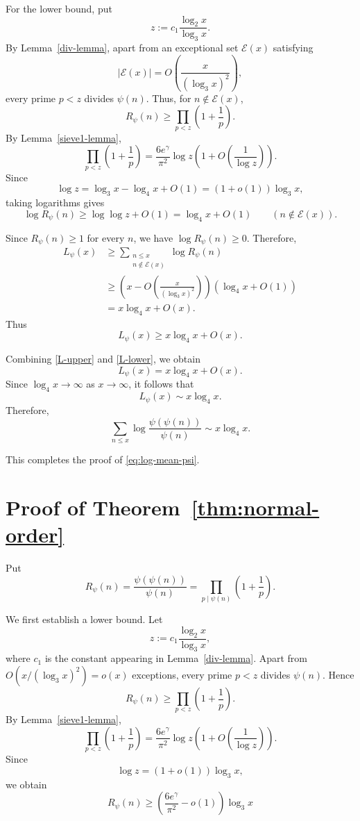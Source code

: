 \documentclass{article}
\theoremstyle{remark}
\begin{document}
For the lower bound, put
\[
z:=c_1\frac{\log_2x}{\log_3x}.
\]
By Lemma~\ref{div-lemma}, apart from an exceptional set
\(\mathcal E(x)\) satisfying
\[
|\mathcal E(x)|
=
O\left(\frac{x}{(\log_3x)^2}\right),
\]
every prime \(p<z\) divides \(\psi(n)\). Thus, for
\(n\notin\mathcal E(x)\),
\[
R_\psi(n)
\ge
\prod_{p<z}\left(1+\frac1p\right).
\]
By Lemma~\ref{sieve1-lemma},
\[
\prod_{p<z}\left(1+\frac1p\right)
=
\frac{6e^\gamma}{\pi^2}\log z
\left(1+O\left(\frac1{\log z}\right)\right).
\]
Since
\[
\log z
=
\log_3x-\log_4x+O(1)
=
(1+o(1))\log_3x,
\]
taking logarithms gives
\[
\log R_\psi(n)
\ge
\log\log z+O(1)
=
\log_4x+O(1)
\qquad
(n\notin\mathcal E(x)).
\]

Since \(R_\psi(n)\ge1\) for every \(n\), we have
\(\log R_\psi(n)\ge0\). Therefore,
\[
\begin{aligned}
L_\psi(x)
&\ge
\sum_{\substack{n\le x\\n\notin\mathcal E(x)}}
\log R_\psi(n)\\
&\ge
\left(
x-O\left(\frac{x}{(\log_3x)^2}\right)
\right)
\left(\log_4x+O(1)\right)\\
&=
x\log_4x+O(x).
\end{aligned}
\]
Thus
\begin{equation}\label{L-lower}
L_\psi(x)
\ge
x\log_4x+O(x).
\end{equation}

Combining \eqref{L-upper} and \eqref{L-lower}, we obtain
\[
L_\psi(x)
=
x\log_4x+O(x).
\]
Since \(\log_4x\to\infty\) as \(x\to\infty\), it follows that
\[
L_\psi(x)
\sim
x\log_4x.
\]
Therefore,
\[
\sum_{n\le x}
\log\frac{\psi(\psi(n))}{\psi(n)}
\sim
x\log_4x.
\]

This completes the proof of \eqref{eq:log-mean-psi}.


\section{Proof of Theorem~\ref{thm:normal-order}}
Put
\[
R_\psi(n)
=
\frac{\psi(\psi(n))}{\psi(n)}
=
\prod_{p\mid\psi(n)}
\left(1+\frac1p\right).
\]

We first establish a lower bound. Let
\[
z:=c_1\frac{\log_2x}{\log_3x},
\]
where \(c_1\) is the constant appearing in
Lemma~\ref{div-lemma}. Apart from
\(O(x/(\log_3x)^2)=o(x)\) exceptions, every prime \(p<z\)
divides \(\psi(n)\). Hence
\[
R_\psi(n)
\ge
\prod_{p<z}\left(1+\frac1p\right).
\]
By Lemma~\ref{sieve1-lemma},
\[
\prod_{p<z}\left(1+\frac1p\right)
=
\frac{6e^\gamma}{\pi^2}\log z
\left(1+O\left(\frac1{\log z}\right)\right).
\]
Since
\[
\log z
=
(1+o(1))\log_3x,
\]
we obtain
\begin{equation}\label{min}
R_\psi(n)
\ge
\left(\frac{6e^\gamma}{\pi^2}-o(1)\right)
\log_3x
\end{equation}
\end{document}
